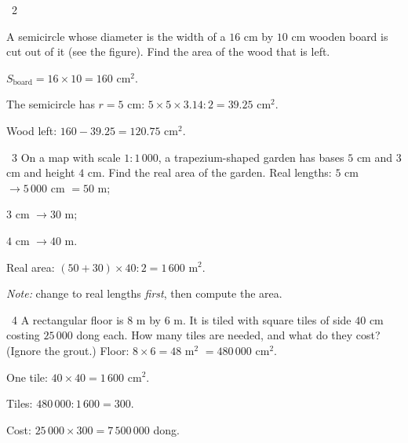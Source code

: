 \gap
\begin{exbox}{\ExWord\ 2}
\begin{minipage}[t]{0.62\linewidth}
A semicircle whose diameter is the width of a $16$ cm by $10$ cm wooden board is cut out of it (see the figure). Find the area of the wood that is left.
\end{minipage}\hfill
\begin{minipage}[t]{0.34\linewidth}\vspace{0pt}\centering
{}
\end{minipage}
\guide
$S_\text{board}=16\times10=160$ cm$^2$.\par The semicircle has $r=5$ cm: $5\times5\times3.14:2=39.25$ cm$^2$.\par
Wood left: $160-39.25=120.75$ cm$^2$.
\end{exbox}
\gap
\begin{exbox}{\ExWord\ 3}
On a map with scale $1:1\,000$, a trapezium-shaped garden has bases $5$ cm and $3$ cm and height $4$ cm. Find the real area of the garden.
\guide
Real lengths: $5$ cm $\to5\,000$ cm $=50$ m;\par $3$ cm $\to30$ m;\par $4$ cm $\to40$ m.\par
Real area: $(50+30)\times40:2=1\,600$ m$^2$.\par
\emph{Note:} change to real lengths \emph{first}, then compute the area.
\end{exbox}
\gap
\begin{exbox}{\ExWord\ 4}
A rectangular floor is $8$ m by $6$ m. It is tiled with square tiles of side $40$ cm costing $25\,000$ dong each. How many tiles are needed, and what do they cost? (Ignore the grout.)
\guide
Floor: $8\times6=48$ m$^2$ $=480\,000$ cm$^2$.\par One tile: $40\times40=1\,600$ cm$^2$.\par
Tiles: $480\,000:1\,600=300$.\par Cost: $25\,000\times300=7\,500\,000$ dong.
\end{exbox}
